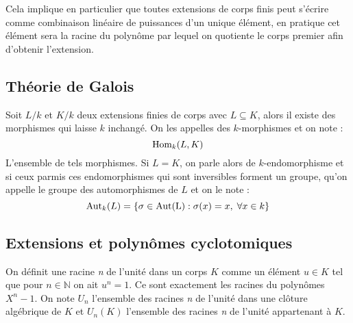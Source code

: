 \documentclass[a4paper]{article} %
\numberwithin{section}{part}
\numberwithin{equation}{section}
\newcommand\nroot[1]{\textit{#1}\up{\textit{ième}}}
\begin{document}
Cela implique en particulier que toutes extensions de corps finis peut s'écrire
comme combinaison linéaire de puissances d'un unique élément, en pratique cet
élément sera la racine du polynôme par lequel on quotiente le corps premier afin
d'obtenir l'extension.

\subsection{Théorie de Galois}

Soit $L/k$ et $K/k$ deux extensions finies de corps avec $L\subseteq K$, alors 
il existe des morphismes qui laisse $k$ inchangé. On les appelles des 
$k$-morphismes et on note :
\[\textup{Hom}_k(L, K)\]
L'ensemble de tels morphismes. Si $L = K$, on parle alors de $k$-endomorphisme
et si ceux parmis ces endomorphismes qui sont inversibles forment un groupe,
qu'on appelle le groupe des automorphismes de $L$ et on le note :
\[\textup{Aut}_k(L) = \lbrace{\sigma\in\textup{Aut(L)} : \sigma(x) = x
,\;\forall x\in k}\rbrace\]

\subsection{Extensions et polynômes cyclotomiques}
On définit une racine \nroot{n} de l'unité dans un corps $K$ 
comme un élément $u\in K$ tel que pour $n\in\mathbb{N}$ on ait $u^n = 1$. Ce 
sont exactement les racines du polynômes $X^n - 1$.
On note $U_n$ l'ensemble des racines \nroot{n} de l'unité dans une clôture 
algébrique de $K$ et $U_n(K)$ l'ensemble des racines \nroot{n} de l'unité 
appartenant à $K$.
\end{document}
